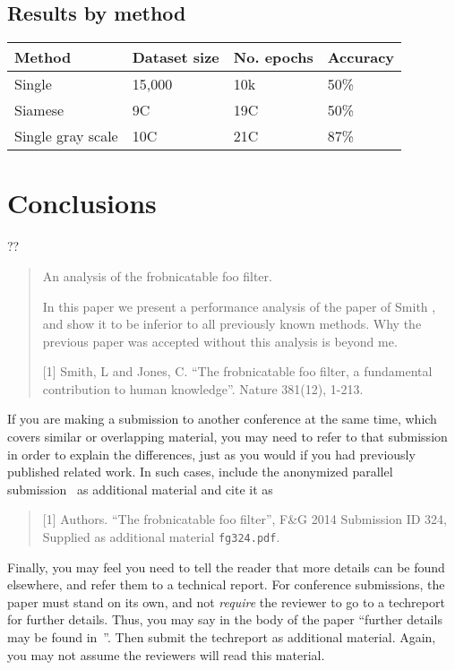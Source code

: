 \documentclass[10pt,twocolumn,letterpaper]{article}
\begin{document}
\subsection{Results by method}


\begin{center}
    \begin{tabular}{ | p{5em} | p{5em} | p{5em} | p{5em} |}
    \hline
    Method & Dataset size & No. epochs & Accuracy \\ [0.5ex] 
    \hline \hline
    Single & 15,000 & 10k & 50\% \\ 
    \hline
    Siamese & 9C & 19C & 50\% \\ \hline
    Single gray scale & 10C & 21C & 87\% \\
    \hline
    \end{tabular}
\end{center}

\section{Conclusions}

??

\begin{quote}
\begin{center}
     An analysis of the frobnicatable foo filter.
\end{center}

   In this paper we present a performance analysis of the paper of Smith \etal
   [1], and show it to be inferior to all previously known methods.  Why the
   previous paper was accepted without this analysis is beyond me.

   [1] Smith, L and Jones, C. ``The frobnicatable foo filter, a fundamental
   contribution to human knowledge''. Nature 381(12), 1-213.
\end{quote}

If you are making a submission to another conference at the same time, which
covers similar or overlapping material, you may need to refer to that submission
in order to explain the differences, just as you would if you had previously
published related work.  In such cases, include the anonymized parallel
submission~\cite{Authors14} as additional material and cite it as
\begin{quote}
[1] Authors. ``The frobnicatable foo filter'', F\&G 2014 Submission ID 324,
Supplied as additional material {\tt fg324.pdf}.
\end{quote}

Finally, you may feel you need to tell the reader that more details can be found
elsewhere, and refer them to a technical report.  For conference submissions,
the paper must stand on its own, and not {\em require} the reviewer to go to a
techreport for further details.  Thus, you may say in the body of the paper
``further details may be found in~\cite{Authors14b}''.  Then submit the
techreport as additional material. Again, you may not assume the reviewers will
read this material.
\end{document}
